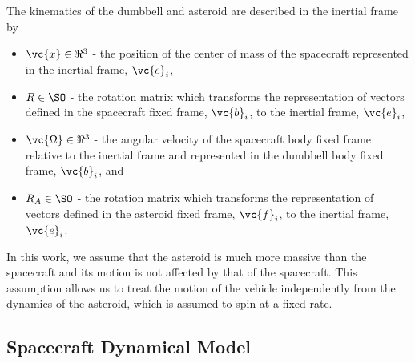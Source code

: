 \documentclass[smallextended]{svjour3}       %
\begin{document}
The kinematics of the dumbbell and asteroid are described in the inertial frame by
\begin{itemize}
    \item \( \vc{x}\in\Re^3 \) - the position of the center of mass of the  spacecraft represented in the inertial frame, \( \vc{e}_i\),
    \item \( R\in\SO \) - the rotation matrix which transforms the representation of vectors defined in the spacecraft fixed frame, \( \vc{b}_i \), to the inertial frame, \( \vc{e}_i \),
    \item \( \vc{\Omega}\in\Re^3 \) - the angular velocity of the spacecraft body fixed frame relative to the inertial frame and represented in the dumbbell body fixed frame, \( \vc{b}_i \), and
    \item \( R_A\in \SO \) - the rotation matrix which transforms the representation of vectors defined in the asteroid fixed frame, \( \vc{f}_i \), to the inertial frame, \( \vc{e}_i \).
\end{itemize}
In this work, we assume that the asteroid is much more massive than the spacecraft and its motion is not affected by that of the spacecraft.
This assumption allows us to treat the motion of the vehicle independently from the dynamics of the asteroid, which is assumed to spin at a fixed rate.  

\subsection{Spacecraft Dynamical Model}
\end{document}
